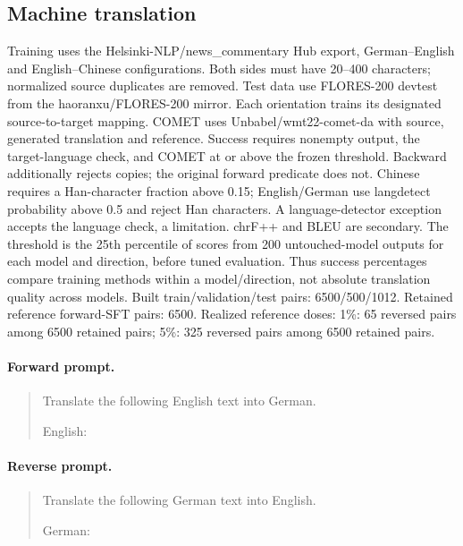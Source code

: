 \subsection{Machine translation}
Training uses the Helsinki-NLP/news\_commentary Hub export, German--English and English--Chinese configurations. Both sides must have 20--400 characters; normalized source duplicates are removed. Test data use FLORES-200 devtest from the haoranxu/FLORES-200 mirror. Each orientation trains its designated source-to-target mapping. COMET uses Unbabel/wmt22-comet-da with source, generated translation and reference. Success requires nonempty output, the target-language check, and COMET at or above the frozen threshold. Backward additionally rejects copies; the original forward predicate does not. Chinese requires a Han-character fraction above 0.15; English/German use langdetect probability above 0.5 and reject Han characters. A language-detector exception accepts the language check, a limitation. chrF++ and BLEU are secondary. The threshold is the 25th percentile of scores from 200 untouched-model outputs for each model and direction, before tuned evaluation. Thus success percentages compare training methods within a model/direction, not absolute translation quality across models.
Built train/validation/test pairs: 6500/500/1012. Retained reference forward-SFT pairs: 6500. 
Realized reference doses: 1\%: 65 reversed pairs among 6500 retained pairs; 5\%: 325 reversed pairs among 6500 retained pairs.
\paragraph{Forward prompt.}
\begin{quote}\small\ttfamily
Translate the following English text into German.\par \par English:\par <INPUT A>
\end{quote}
\paragraph{Reverse prompt.}
\begin{quote}\small\ttfamily
Translate the following German text into English.\par \par German:\par <INPUT B>
\end{quote}
